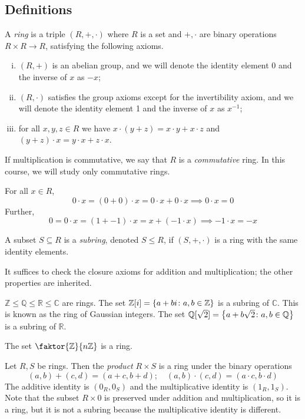 \subsection{Definitions}
\begin{definition}
	A \textit{ring} is a triple \( (R, +, \cdot) \) where \( R \) is a set and \( +, \cdot \) are binary operations \( R \times R \to R \), satisfying the following axioms.
	\begin{enumerate}[(i)]
		\item \( (R, +) \) is an abelian group, and we will denote the identity element 0 and the inverse of \( x \) as \( -x \);
		\item \( (R, \cdot) \) satisfies the group axioms except for the invertibility axiom, and we will denote the identity element 1 and the inverse of \( x \) as \( x^{-1} \);
		\item for all \( x, y, z \in R \) we have \( x \cdot (y+z) = x\cdot y + x\cdot z \) and \( (y+z)\cdot x = y \cdot x + z \cdot x \).
	\end{enumerate}
	If multiplication is commutative, we say that \( R \) is a \textit{commutative} ring.
	In this course, we will study only commutative rings.
\end{definition}
\begin{remark}
	For all \( x \in R \),
	\[ 0 \cdot x = (0+0) \cdot x = 0 \cdot x + 0 \cdot x \implies 0 \cdot x = 0 \]
	Further,
	\[ 0 = 0 \cdot x = (1 + -1) \cdot x = x + (-1 \cdot x) \implies -1 \cdot x = -x \]
\end{remark}
\begin{definition}
	A subset \( S \subseteq R \) is a \textit{subring}, denoted \( S \leq R \), if \( (S, +, \cdot) \) is a ring with the same identity elements.
\end{definition}
\begin{remark}
	It suffices to check the closure axioms for addition and multiplication; the other properties are inherited.
\end{remark}
\begin{example}
	\( \mathbb Z \leq \mathbb Q \leq \mathbb R \leq \mathbb C \) are rings.
	The set \( \mathbb Z[i] = \qty{a+bi \colon a,b\in\mathbb Z} \) is a subring of \( \mathbb C \).
	This is known as the ring of Gaussian integers.
	The set \( \mathbb Q[\sqrt{2}] = \qty{a+b\sqrt{2} \colon a,b \in\mathbb Q} \) is a subring of \( \mathbb R \).
\end{example}
\begin{example}
	The set \( \faktor{\mathbb Z}{n\mathbb Z} \) is a ring.
\end{example}
\begin{example}
	Let \( R, S \) be rings.
	Then the \textit{product} \( R \times S \) is a ring under the binary operations
	\[ (a,b) + (c,d) = (a+c,b+d);\quad (a,b) \cdot (c,d) = (a\cdot c,b\cdot d) \]
	The additive identity is \( (0_R, 0_S) \) and the multiplicative identity is \( (1_R, 1_S) \).
	Note that the subset \( R \times \qty{0} \) is preserved under addition and multiplication, so it is a ring, but it is not a subring because the multiplicative identity is different.
\end{example}

